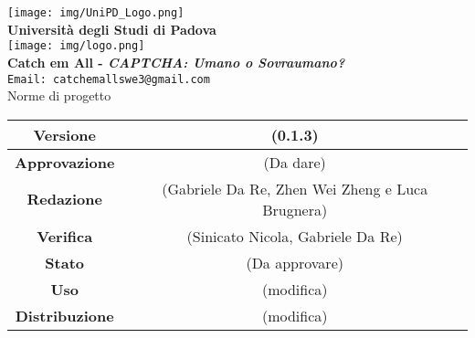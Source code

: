 \thispagestyle{empty}
\begin{titlepage}
\begin{center}
	\texttt{[image: img/UniPD\_Logo.png]}\\
	\bigskip
	\large \textbf{Università degli Studi di Padova}\\
	
	\texttt{[image: img/logo.png]}\\
	\bigskip
	\large \textbf{Catch em All - \textit{CAPTCHA: Umano o Sovraumano?}}\\
	\texttt{Email: catchemallswe3@gmail.com}\\
	\vfill
	{\fontsize{1.5cm}{0}\selectfont Norme di progetto}\\
	\vfill
	\begin{tabularx}{\textwidth}{| c | c |}
		\hline
		\textbf{Versione} & (0.1.3)\\
		\hline
		\textbf{Approvazione} & (Da dare)\\
		\hline
		\textbf{Redazione} & (Gabriele Da Re, Zhen Wei Zheng e Luca Brugnera)\\
		\hline
		\textbf{Verifica} & (Sinicato Nicola, Gabriele Da Re)\\
		\hline
		\textbf{Stato} & (Da approvare)\\
		\hline
		\textbf{Uso} & (modifica)\\
		\hline
		\textbf{Distribuzione} & (modifica)\\
		\hline
	\end{tabularx}
\end{center}
\end{titlepage}